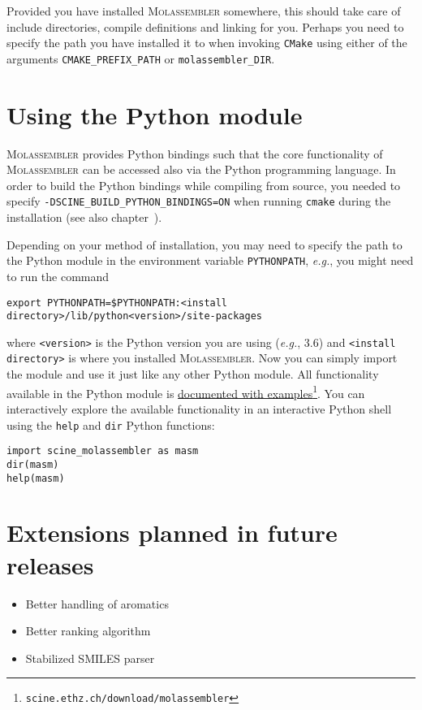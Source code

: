 \documentclass[]{tufte-book}
\begin{document}
Provided you have installed \textsc{Molassembler} somewhere, this should take
care of include directories, compile definitions and linking for you. Perhaps
you need to specify the path you have installed it to when invoking
\texttt{CMake} using either of the arguments \texttt{CMAKE\_PREFIX\_PATH} or
\texttt{molassembler\_DIR}.

\newpage
\chapter{Using the Python module}

\textsc{Molassembler} provides Python bindings such that the core functionality
of \textsc{Molassembler} can be accessed also via the Python programming
language. In order to build the Python bindings while compiling from source, you
needed to specify \texttt{-DSCINE\_BUILD\_PYTHON\_BINDINGS=ON} when running
\texttt{cmake} during the installation (see also
chapter~).

Depending on your method of installation, you may need to specify the path to
the Python module in the environment variable \texttt{PYTHONPATH},
\textit{e.g.}, you might need to run the command 

\begin{Verbatim} 
export PYTHONPATH=$PYTHONPATH:<install directory>/lib/python<version>/site-packages 
\end{Verbatim} 

where \texttt{<version>} is the Python version you are using (\textit{e.g.},
3.6) and \texttt{<install directory>} is where you installed
\textsc{Molassembler}. Now you can simply import the module and use it just
like any other Python module. All functionality available in the Python module
is
\href{https://scine.ethz.ch/static/download/documentation/molassembler/v1.2.0/py}{documented with
examples}\footnote{\texttt{scine.ethz.ch/download/molassembler}}. You can
interactively explore the available functionality in an interactive Python shell
using the \texttt{help} and \texttt{dir} Python functions:

\begin{Verbatim}
import scine_molassembler as masm
dir(masm)
help(masm)
\end{Verbatim}

\chapter{Extensions planned in future releases}
\begin{itemize}
  \item Better handling of aromatics
  \item Better ranking algorithm
  \item Stabilized SMILES parser
\end{itemize}
\end{document}
